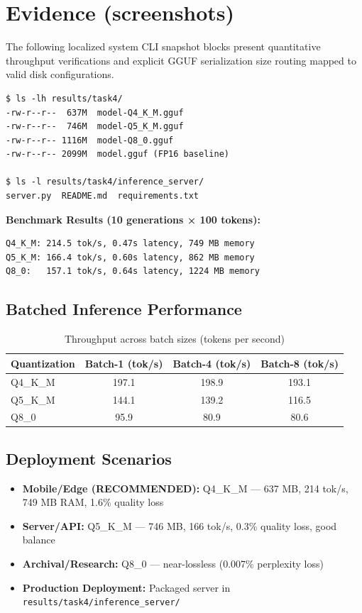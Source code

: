 \documentclass[11pt,a4paper]{article}
\begin{document}
\section*{Evidence (screenshots)}
The following localized system CLI snapshot blocks present quantitative throughput verifications and explicit GGUF serialization size routing mapped to valid disk configurations.
\begin{verbatim}
$ ls -lh results/task4/
-rw-r--r--  637M  model-Q4_K_M.gguf
-rw-r--r--  746M  model-Q5_K_M.gguf
-rw-r--r-- 1116M  model-Q8_0.gguf
-rw-r--r-- 2099M  model.gguf (FP16 baseline)

$ ls -l results/task4/inference_server/
server.py  README.md  requirements.txt
\end{verbatim}

\textbf{Benchmark Results (10 generations × 100 tokens):}
\begin{verbatim}
Q4_K_M: 214.5 tok/s, 0.47s latency, 749 MB memory
Q5_K_M: 166.4 tok/s, 0.60s latency, 862 MB memory
Q8_0:   157.1 tok/s, 0.64s latency, 1224 MB memory
\end{verbatim}

\subsection*{Batched Inference Performance}
\begin{table}[H]
\centering
\small
\begin{tabular}{@{}lccc@{}}
\toprule
\textbf{Quantization} & \textbf{Batch-1 (tok/s)} & \textbf{Batch-4 (tok/s)} & \textbf{Batch-8 (tok/s)} \\
\midrule
Q4\_K\_M & 197.1 & 198.9 & 193.1 \\
Q5\_K\_M & 144.1 & 139.2 & 116.5 \\
Q8\_0 & 95.9 & 80.9 & 80.6 \\
\bottomrule
\end{tabular}
\caption{Throughput across batch sizes (tokens per second)}
\end{table}

\subsection*{Deployment Scenarios}
\begin{itemize}
    \item \textbf{Mobile/Edge (RECOMMENDED):} Q4\_K\_M — 637 MB, 214 tok/s, 749 MB RAM, 1.6\% quality loss
    \item \textbf{Server/API:} Q5\_K\_M — 746 MB, 166 tok/s, 0.3\% quality loss, good balance
    \item \textbf{Archival/Research:} Q8\_0 — near-lossless (0.007\% perplexity loss)
    \item \textbf{Production Deployment:} Packaged server in \texttt{results/task4/inference\_server/}
\end{itemize}
\end{document}
